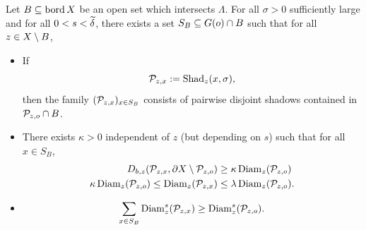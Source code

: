 \begin{lemma}
\label{sublemmaDSU}
Let $B\subseteq\operatorname{bord} X$ be an open set which intersects $\Lambda$. For all $\sigma > 0$ sufficiently large and for all $0 < s < \widetilde\delta$, there exists a set $S_B\subseteq G(o)\cap B$ such that for all $z\in X\setminus B$,
\begin{itemize}
\item[(i)] If
\[
\mathcal P_{z,x} := \operatorname{Shad}_z(x,\sigma),
\]
then the family $(\mathcal P_{z,x})_{x\in S_B}$ consists of pairwise disjoint shadows contained in $\mathcal P_{z,o}\cap B$.
\item[(ii)] There exists $\kappa > 0$ independent of $z$ (but depending on $s$) such that for all $x\in S_B$,
\begin{align} \label{epsilonnew}
D_{b,z}(\mathcal P_{z,x},\partial X\setminus \mathcal P_{z,o}) &\geq \kappa\operatorname{Diam}_z(\mathcal P_{z,o})\\ \label{lambdanew}
\kappa\operatorname{Diam}_z(\mathcal P_{z,o}) \leq \operatorname{Diam}_z(\mathcal P_{z,x}) &\leq \lambda\operatorname{Diam}_z(\mathcal P_{z,o}).
\end{align}
\item[(iii)]
\[
\sum_{x\in S_B}\operatorname{Diam}_z^s(\mathcal P_{z,x}) \geq \operatorname{Diam}_z^s(\mathcal P_{z,o}).
\]
\end{itemize}
\end{lemma}
